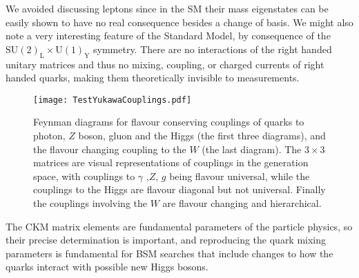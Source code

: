 %
We avoided discussing leptons since in the SM their mass eigenstates can be easily shown to have no real consequence besides a change of basis. 
%
We might also note a very interesting feature of the Standard Model, by consequence of the $\mathrm{SU(2)_L \times U(1)_Y }$ symmetry. There are no interactions of the right handed unitary matrices and thus no mixing, coupling, or charged currents of right handed quarks, making them theoretically invisible to measurements.  
%
\begin{figure}[H]
	\centering
	\texttt{[image: TestYukawaCouplings.pdf]}
	\caption{Feynman diagrams for flavour conserving couplings of quarks to photon, $Z$ boson, gluon and the Higgs (the first three diagrams), and the flavour changing coupling to the $W$ (the last diagram). The $3\times3$ matrices are visual representations of couplings in the generation space, with couplings to $\gamma$ ,$Z$, $g$ being flavour universal, while the couplings to the Higgs are flavour diagonal but not universal. Finally the couplings involving the $W$ are flavour changing and hierarchical. }
	\label{fig:QuarkCKM}
\end{figure}
The CKM matrix elements are fundamental parameters of the particle physics, so their precise determination is important, and reproducing the quark mixing parameters is fundamental for BSM searches that include changes to how the quarks interact with possible new Higgs bosons. 
